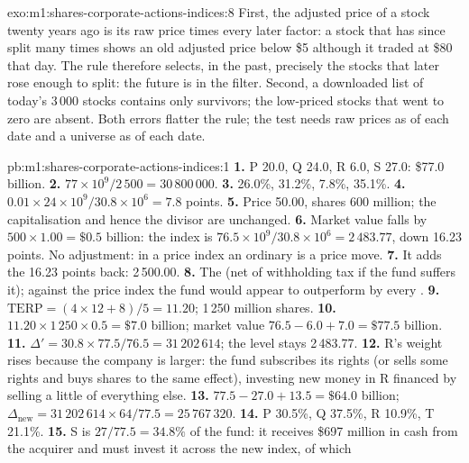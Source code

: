 \begin{solution}{exo:m1:shares-corporate-actions-indices:8}
First, the adjusted price of a stock twenty years ago is its raw price times
every later factor: a stock that has since split many times shows an old
adjusted price below \$5 although it traded at \$80 that day. The rule
therefore selects, in the past, precisely the stocks that later rose enough
to split: the future is in the filter. Second, a downloaded list of today's
3\,000 stocks contains only survivors; the low-priced stocks that went to
zero are absent. Both errors flatter the rule; the test needs raw prices as
of each date and a universe as of each date.
\end{solution}

\begin{solution}{pb:m1:shares-corporate-actions-indices:1}
\textbf{1.} P 20.0, Q 24.0, R 6.0, S 27.0: \$77.0 billion.
\textbf{2.} $77\times10^9/2\,500 = 30\,800\,000$.
\textbf{3.} 26.0\%, 31.2\%, 7.8\%, 35.1\%.
\textbf{4.} $0.01 \times 24\times10^9/30.8\times10^6 = 7.8$ points.
\textbf{5.} Price 50.00, shares 600 million; the capitalisation and hence
the divisor are unchanged.
\textbf{6.} Market value falls by $500 \times 1.00 = \$0.5$ billion: the
index is $76.5\times10^9/30.8\times10^6 = 2\,483.77$, down 16.23 points. No
adjustment: in a price index an ordinary  is a price move.
\textbf{7.} It adds the 16.23 points back: 2\,500.00.
\textbf{8.} The  (net of withholding tax if the fund
suffers it); against the price index the fund would appear to outperform by
every .
\textbf{9.} $\mathrm{TERP} = (4\times12 + 8)/5 = 11.20$; 1\,250 million
shares.
\textbf{10.} $11.20 \times 1\,250 \times 0.5 = \$7.0$ billion; market value
$76.5 - 6.0 + 7.0 = \$77.5$ billion.
\textbf{11.} $\Delta' = 30.8 \times 77.5/76.5 = 31\,202\,614$; the level
stays 2\,483.77.
\textbf{12.} R's weight rises because the company is larger: the fund
subscribes its rights (or sells some rights and buys shares to the same
effect), investing new money in R financed by selling a little of everything
else.
\textbf{13.} $77.5 - 27.0 + 13.5 = \$64.0$ billion; $\Delta_{\text{new}} = 31\,202\,614
\times 64/77.5 = 25\,767\,320$.
\textbf{14.} P 30.5\%, Q 37.5\%, R 10.9\%, T 21.1\%.
\textbf{15.} S is $27/77.5 = 34.8\%$ of the fund: it receives \$697 million
in cash from the acquirer and must invest it across the new index, of which

\end{solution}

